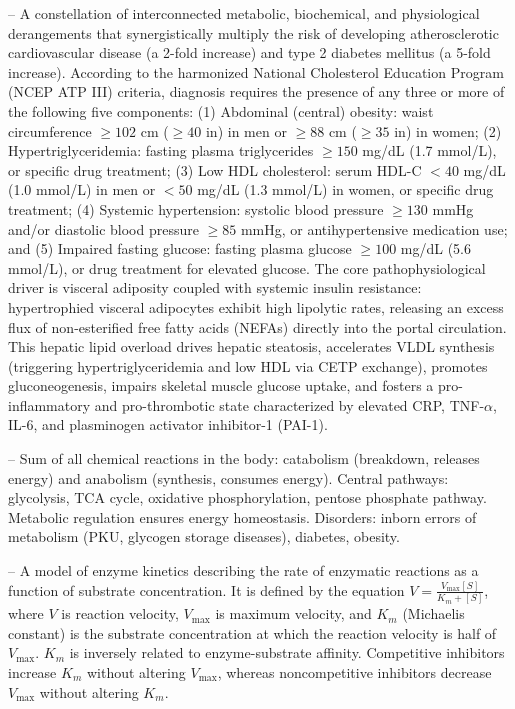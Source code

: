 -- A constellation of interconnected metabolic, biochemical, and physiological derangements that synergistically multiply the risk of developing atherosclerotic cardiovascular disease (a 2-fold increase) and type 2 diabetes mellitus (a 5-fold increase). According to the harmonized National Cholesterol Education Program (NCEP ATP III) criteria, diagnosis requires the presence of any three or more of the following five components: (1) Abdominal (central) obesity: waist circumference $\ge 102$ cm ($\ge 40$ in) in men or $\ge 88$ cm ($\ge 35$ in) in women; (2) Hypertriglyceridemia: fasting plasma triglycerides $\ge 150$ mg/dL (1.7 mmol/L), or specific drug treatment; (3) Low HDL cholesterol: serum HDL-C $<40$ mg/dL (1.0 mmol/L) in men or $<50$ mg/dL (1.3 mmol/L) in women, or specific drug treatment; (4) Systemic hypertension: systolic blood pressure $\ge 130$ mmHg and/or diastolic blood pressure $\ge 85$ mmHg, or antihypertensive medication use; and (5) Impaired fasting glucose: fasting plasma glucose $\ge 100$ mg/dL (5.6 mmol/L), or drug treatment for elevated glucose. The core pathophysiological driver is visceral adiposity coupled with systemic insulin resistance: hypertrophied visceral adipocytes exhibit high lipolytic rates, releasing an excess flux of non-esterified free fatty acids (NEFAs) directly into the portal circulation. This hepatic lipid overload drives hepatic steatosis, accelerates VLDL synthesis (triggering hypertriglyceridemia and low HDL via CETP exchange), promotes gluconeogenesis, impairs skeletal muscle glucose uptake, and fosters a pro-inflammatory and pro-thrombotic state characterized by elevated CRP, TNF-$\alpha$, IL-6, and plasminogen activator inhibitor-1 (PAI-1).

-- Sum of all chemical reactions in the body: catabolism (breakdown, releases energy) and anabolism (synthesis, consumes energy). Central pathways: glycolysis, TCA cycle, oxidative phosphorylation, pentose phosphate pathway. Metabolic regulation ensures energy homeostasis. Disorders: inborn errors of metabolism (PKU, glycogen storage diseases), diabetes, obesity.

-- A model of enzyme kinetics describing the rate of enzymatic reactions as a function of substrate concentration. It is defined by the equation $V = \frac{V_{\max}[S]}{K_m + [S]}$, where $V$ is reaction velocity, $V_{\max}$ is maximum velocity, and $K_m$ (Michaelis constant) is the substrate concentration at which the reaction velocity is half of $V_{\max}$. $K_m$ is inversely related to enzyme-substrate affinity. Competitive inhibitors increase $K_m$ without altering $V_{\max}$, whereas noncompetitive inhibitors decrease $V_{\max}$ without altering $K_m$.


